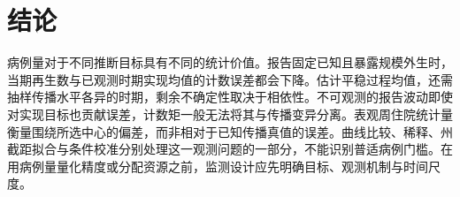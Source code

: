 \section{结论}
\label{sec:conclusion}

病例量对于不同推断目标具有不同的统计价值。报告固定已知且暴露规模外生时，当期再生数与已观测时期实现均值的计数误差都会下降。估计平稳过程均值，还需抽样传播水平各异的时期，剩余不确定性取决于相依性。不可观测的报告波动即使对实现目标也贡献误差，计数矩一般无法将其与传播变异分离。表观周住院统计量衡量围绕所选中心的偏差，而非相对于已知传播真值的误差。曲线比较、稀释、州截距拟合与条件校准分别处理这一观测问题的一部分，不能识别普适病例门槛。在用病例量量化精度或分配资源之前，监测设计应先明确目标、观测机制与时间尺度。
